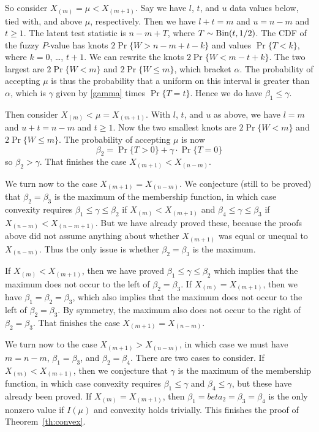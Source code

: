 \documentclass{article}
\newcommand{\BinomialDis}{\text{\upshape Bin}}
\begin{document}
So consider $X_{(m)} = \mu < X_{(m + 1)}$.
Say we have $l$, $t$, and $u$ data values below, tied with, and above
$\mu$, respectively.
Then we have $l + t = m$ and $u = n - m$ and $t \ge 1$.
The latent test statistic is $n - m + T$,
where $T \sim \BinomialDis(t, 1 / 2)$.
The CDF of the fuzzy $P$-value has
knots $2 \Pr\{ W > n - m + t - k \}$ and
values $\Pr\{ T < k \}$, where $k = 0$, \ldots, $t + 1$.
We can rewrite the
knots $2 \Pr\{ W < m - t + k \}$.  The two largest
are $2 \Pr \{ W < m \}$ and $2 \Pr \{ W \le m \}$, which bracket $\alpha$.
The probability of accepting $\mu$ is thus the probability that a uniform
on this interval is greater than $\alpha$, which is $\gamma$ given by
\eqref{gamma} times $\Pr \{ T = t \}$.  Hence we do have $\beta_1 \le \gamma$.

Then consider $X_{(m)} < \mu = X_{(m + 1)}$.
With $l$, $t$, and $u$ as above,
we have $l = m$ and $u + t = n - m$ and $t \ge 1$.
Now the two smallest knots
are $2 \Pr \{ W < m \}$ and $2 \Pr \{ W \le m \}$.
The probability of accepting $\mu$ is now
$$
   \beta_2 = \Pr\{ T > 0 \} + \gamma \cdot \Pr \{ T = 0 \}
$$
so $\beta_2 > \gamma$.
That finishes the case $X_{(m + 1)} < X_{(n - m)}$.

We turn now to the case $X_{(m + 1)} = X_{(n - m)}$.  We conjecture
(still to be proved)
that $\beta_2 = \beta_3$ is the maximum of the membership function,
in which case convexity requires
$\beta_1 \le \gamma \le \beta_2$ if $X_{(m)} < X_{(m + 1)}$
and
$\beta_4 \le \gamma \le \beta_3$ if $X_{(n - m)} < X_{(n - m + 1)}$.
But we have already proved these, because the proofs above did not assume
anything about whether $X_{(m + 1)}$ was equal or unequal to $X_{(n - m)}$.
Thus the only issue is whether $\beta_2 = \beta_3$ is the maximum.

If $X_{(m)} < X_{(m + 1)}$, then we have
proved $\beta_1 \le \gamma \le \beta_2$ which implies that the maximum
does not occur to the left of $\beta_2 = \beta_3$.
If $X_{(m)} = X_{(m + 1)}$, then we have $\beta_1 = \beta_2 = \beta_3$,
which also implies that the maximum
does not occur to the left of $\beta_2 = \beta_3$.
By symmetry, the maximum also
does not occur to the right of $\beta_2 = \beta_3$.
That finishes the case $X_{(m + 1)} = X_{(n - m)}$.

We turn now to the case $X_{(m + 1)} > X_{(n - m)}$, in which case we
must have $m = n - m$, $\beta_1 = \beta_3$, and $\beta_2 = \beta_4$.
There are two cases to consider.  If $X_{(m)} < X_{(m + 1)}$, then
we conjecture that $\gamma$ is the maximum of the membership function,
in which case convexity requires $\beta_1 \le \gamma$ and $\beta_4 \le \gamma$,
but these have already been proved.
If $X_{(m)} = X_{(m + 1)}$, then $\beta_1 = beta_2 = \beta_3 = \beta_4$ is
the only nonzero value if $I(\mu)$ and convexity holds trivially.
This finishes the proof of Theorem~\ref{th:convex}.
\end{document}
